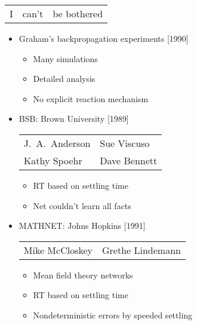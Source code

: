 
\begin{slide*}

\begin{tabular}{lll}
I & can't & be bothered
\end{tabular}


\end{slide*}



\begin{slide*}



\end{slide*}


\begin{slide*}

\begin{itemize}
\item Graham's backpropagation experiments [1990]
\begin{itemize}
\item Many simulations
\item Detailed analysis
\item No explicit reaction mechanism
\end{itemize}

\item BSB: Brown University [1989]
\begin{tabular}{ll}
J.~A.~Anderson&Sue Viscuso\\
Kathy Spoehr&Dave Bennett
\end{tabular}

\begin{itemize}
\item RT based on settling time
\item Net couldn't learn all facts
\end{itemize}

\item MATHNET: Johns Hopkins [1991]
\begin{tabular}{ll}
Mike McCloskey&Grethe Lindemann
\end{tabular}
\begin{itemize}
\item Mean field theory networks
\item RT based on settling time
\item Nondeterministic errors by speeded settling
\end{itemize}

\end{itemize}
\end{slide*}

